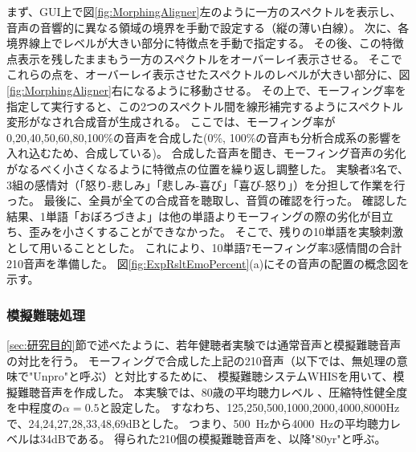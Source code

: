 まず、GUI上で図\ref{fig:MorphingAligner}左のように一方のスペクトルを表示し、音声の音響的に異なる領域の境界を手動で設定する（縦の薄い白線）。
次に、各境界線上でレベルが大きい部分に特徴点を手動で指定する。
その後、この特徴点表示を残したままもう一方のスペクトルをオーバーレイ表示させる。
そこでこれらの点を、オーバーレイ表示させたスペクトルのレベルが大きい部分に、図\ref{fig:MorphingAligner}右になるように移動させる。
その上で、モーフィング率を指定して実行すると、この2つのスペクトル間を線形補完するようにスペクトル変形がなされ合成音が生成される。
ここでは、モーフィング率が 0,20,40,50,60,80,100\%の音声を合成した(0\%, 100\%の音声も分析合成系の影響を入れ込むため、合成している)。
合成した音声を聞き、モーフィング音声の劣化がなるべく小さくなるように特徴点の位置を繰り返し調整した。
実験者3名で、3組の感情対（「怒り-悲しみ」「悲しみ-喜び」「喜び-怒り」）を分担して作業を行った。
最後に、全員が全ての合成音を聴取し、音質の確認を行った。
確認した結果、1単語「おぼろづきよ」は他の単語よりモーフィングの際の劣化が目立ち、歪みを小さくすることができなかった。
そこで、残りの10単語を実験刺激として用いることとした。
これにより、10単語\time 7モーフィング率\time 3感情間の合計210音声を準備した。
図\ref{fig:ExpRsltEmoPercent}(a)にその音声の配置の概念図を示す。






\subsubsection{模擬難聴処理}

\ref{sec:研究目的}節で述べたように、若年健聴者実験では通常音声と模擬難聴音声の対比を行う。
モーフィングで合成した上記の210音声（以下では、無処理の意味で"Unpro"と呼ぶ）と対比するために、
模擬難聴システムWHIS\cite{irino2023hearing}を用いて、模擬難聴音声を作成した。
本実験では、80歳の平均聴力レベル \cite{tsuiki2002nihon_Jpn}、圧縮特性健全度を中程度の$\alpha=0.5$と設定した。
すなわち、125,250,500,1000,2000,4000,8000Hzで、24,24,27,28,33,48,69dBとした。
つまり、500~Hzから4000~Hzの平均聴力レベルは34dBである。
得られた210個の模擬難聴音声を、以降"80yr"と呼ぶ。


